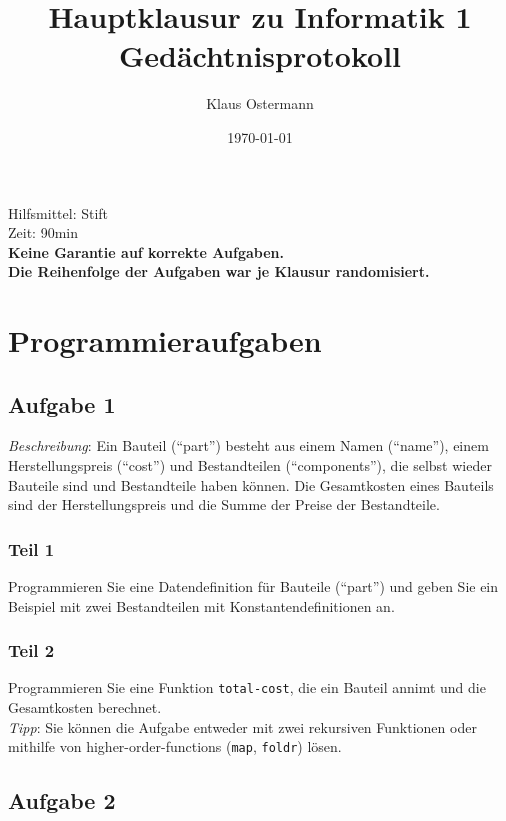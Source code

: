 \documentclass[a4paper, 11pt]{article}
\begin{document}
\title{\vspace{-2.0cm}Hauptklausur zu Informatik 1\\Gedächtnisprotokoll}
\author{Klaus Ostermann}
\date{\today}

\maketitle

\begin{center}
	Hilfsmittel: Stift\\
	Zeit: 90min\\
	\textbf{Keine Garantie auf korrekte Aufgaben.\\Die Reihenfolge der Aufgaben war je Klausur randomisiert.}
\end{center}

\section{Programmieraufgaben}

\subsection*{Aufgabe 1}
\textit{Beschreibung}: Ein Bauteil (\enquote{part}) besteht aus einem Namen (\enquote{name}), einem Herstellungspreis (\enquote{cost}) und Bestandteilen (\enquote{components}), die selbst wieder Bauteile sind und Bestandteile haben können. Die Gesamtkosten eines Bauteils sind der Herstellungspreis und die Summe der Preise der Bestandteile.

\subsubsection*{Teil 1}
Programmieren Sie eine Datendefinition für Bauteile (\enquote{part}) und geben Sie ein Beispiel mit zwei Bestandteilen mit Konstantendefinitionen an.

\subsubsection*{Teil 2}
Programmieren Sie eine Funktion \texttt{total-cost}, die ein Bauteil annimt und die Gesamtkosten berechnet.\\\textit{Tipp}: Sie können die Aufgabe entweder mit zwei rekursiven Funktionen oder mithilfe von higher-order-functions (\texttt{map}, \texttt{foldr}) lösen.

\subsection*{Aufgabe 2}
\end{document}
